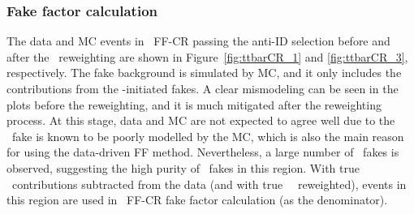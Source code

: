 \subsubsection{Fake factor calculation}
The data and MC events in \ttbar\ FF-CR passing the anti-ID selection 
before and after the \ttbar\ reweighting 
are shown in Figure~\ref{fig:ttbarCR_1} and \ref{fig:ttbarCR_3}, respectively.
The fake background is simulated by MC, and it only includes 
the contributions from the \ttbar-initiated fakes. 
A clear mismodeling can be seen in the plots before 
the reweighting, and it is much mitigated after the 
reweighting process. At this stage, data and MC are 
not expected to agree well due to the \ttbar\ fake is known to
be poorly modelled by the MC, which is also the main reason 
for using the data-driven FF method. 
Nevertheless, a large number of \ttbar\ fakes is observed, suggesting
the high purity of \ttbar\ fakes in this region. 
With true \tauhad\ contributions subtracted from the data 
(and with true \tauhad\ \ttbar\ reweighted),  
events in this region are used in \ttbar\ FF-CR fake factor calculation
(as the denominator). 




